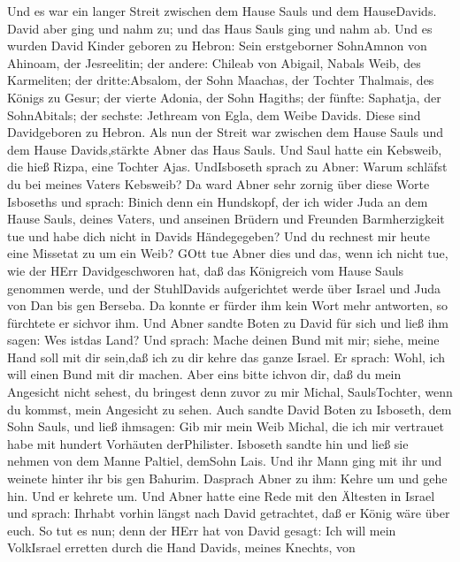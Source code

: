  Und es war ein langer Streit zwischen dem Hause Sauls und
dem HauseDavids. David aber ging und nahm zu; und das Haus Sauls ging
und nahm ab.  Und es wurden David Kinder geboren zu Hebron:
Sein erstgeborner SohnAmnon von Ahinoam, der Jesreelitin; 
der andere: Chileab von Abigail, Nabals Weib, des Karmeliten; der
dritte:Absalom, der Sohn Maachas, der Tochter Thalmais, des Königs zu
Gesur;  der vierte Adonia, der Sohn Hagiths; der fünfte:
Saphatja, der SohnAbitals;  der sechste: Jethream von Egla,
dem Weibe Davids. Diese sind Davidgeboren zu Hebron.  Als
nun der Streit war zwischen dem Hause Sauls und dem Hause Davids,stärkte
Abner das Haus Sauls.  Und Saul hatte ein Kebsweib, die hieß
Rizpa, eine Tochter Ajas. UndIsboseth sprach zu Abner: Warum schläfst du
bei meines Vaters Kebsweib?  Da ward Abner sehr zornig über
diese Worte Isboseths und sprach: Binich denn ein Hundskopf, der ich
wider Juda an dem Hause Sauls, deines Vaters, und anseinen Brüdern und
Freunden Barmherzigkeit tue und habe dich nicht in Davids Händegegeben?
Und du rechnest mir heute eine Missetat zu um ein Weib? 
GOtt tue Abner dies und das, wenn ich nicht tue, wie der HErr
Davidgeschworen hat,  daß das Königreich vom Hause Sauls
genommen werde, und der StuhlDavids aufgerichtet werde über Israel und
Juda von Dan bis gen Berseba.  Da konnte er fürder ihm kein
Wort mehr antworten, so fürchtete er sichvor ihm.  Und
Abner sandte Boten zu David für sich und ließ ihm sagen: Wes istdas
Land? Und sprach: Mache deinen Bund mit mir; siehe, meine Hand soll mit
dir sein,daß ich zu dir kehre das ganze Israel.  Er sprach:
Wohl, ich will einen Bund mit dir machen. Aber eins bitte ichvon dir,
daß du mein Angesicht nicht sehest, du bringest denn zuvor zu mir
Michal, SaulsTochter, wenn du kommst, mein Angesicht zu sehen.
 Auch sandte David Boten zu Isboseth, dem Sohn Sauls, und
ließ ihmsagen: Gib mir mein Weib Michal, die ich mir vertrauet habe mit
hundert Vorhäuten derPhilister.  Isboseth sandte hin und
ließ sie nehmen von dem Manne Paltiel, demSohn Lais.  Und
ihr Mann ging mit ihr und weinete hinter ihr bis gen Bahurim. Dasprach
Abner zu ihm: Kehre um und gehe hin. Und er kehrete um. 
Und Abner hatte eine Rede mit den Ältesten in Israel und sprach: Ihrhabt
vorhin längst nach David getrachtet, daß er König wäre über euch.
 So tut es nun; denn der HErr hat von David gesagt: Ich
will mein VolkIsrael erretten durch die Hand Davids, meines Knechts, von
